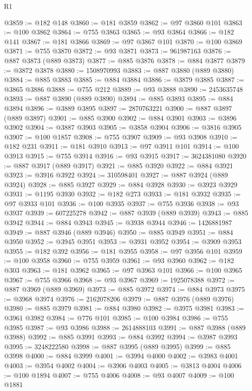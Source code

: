 \begin{lexlean}{R1}
\begin{coremodule}
@3859 := @182 @148
@3860 := @181 @3859
@3862 := @97 @3860 @101
@3863 := @100 @3862
@3864 := @755 @3863
@3865 := @93 @3864
@3866 := @182 @141
@3867 := @181 @3866
@3869 := @97 @3867 @101
@3870 := @100 @3869
@3871 := @755 @3870
@3872 := @93 @3871
@3873 := 961987163
@3876 := @887 @3873 (@889 @3873)
@3877 := @885 @3876
@3878 := @884 @3877
@3879 := @3872 @3878
@3880 := 1508970993
@3883 := @887 @3880 (@889 @3880)
@3884 := @885 @3883
@3885 := @884 @3884
@3886 := @3879 @3885
@3887 := @3865 @3886
@3888 := @755 @212
@3889 := @93 @3888
@3890 := 2453635748
@3893 := @887 @3890 (@889 @3890)
@3894 := @885 @3893
@3895 := @884 @3894
@3896 := @3889 @3895
@3897 := 2870763221
@3900 := @887 @3897 (@889 @3897)
@3901 := @885 @3900
@3902 := @884 @3901
@3903 := @3896 @3902
@3904 := @3887 @3903
@3905 := @3858 @3904
@3906 := @3816 @3905
@3907 := @100 @1857
@3908 := @755 @3907
@3909 := @93 @3908
@3910 := @182 @231
@3911 := @181 @3910
@3913 := @97 @3911 @101
@3914 := @100 @3913
@3915 := @755 @3914
@3916 := @93 @3915
@3917 := 3624381080
@3920 := @887 @3917 (@889 @3917)
@3921 := @885 @3920
@3922 := @884 @3921
@3923 := @3916 @3922
@3924 := 310598401
@3927 := @887 @3924 (@889 @3924)
@3928 := @885 @3927
@3929 := @884 @3928
@3930 := @3923 @3929
@3931 := @1195 @3930
@3932 := @182 @273
@3933 := @181 @3932
@3935 := @97 @3933 @101
@3936 := @100 @3935
@3937 := @755 @3936
@3938 := @93 @3937
@3939 := 607225278
@3942 := @887 @3939 (@889 @3939)
@3943 := @885 @3942
@3944 := @884 @3943
@3945 := @3938 @3944
@3946 := 1426881987
@3949 := @887 @3946 (@889 @3946)
@3950 := @885 @3949
@3951 := @884 @3950
@3952 := @3945 @3951
@3953 := @3931 @3952
@3954 := @3909 @3953
@3955 := @182 @392
@3956 := @181 @3955
@3958 := @97 @3956 @101
@3959 := @100 @3958
@3960 := @755 @3959
@3961 := @93 @3960
@3962 := @182 @303
@3963 := @181 @3962
@3965 := @97 @3963 @101
@3966 := @100 @3965
@3967 := @755 @3966
@3968 := @93 @3967
@3969 := 1925078388
@3972 := @887 @3969 (@889 @3969)
@3973 := @885 @3972
@3974 := @884 @3973
@3975 := @3968 @3974
@3976 := 2162078206
@3979 := @887 @3976 (@889 @3976)
@3980 := @885 @3979
@3981 := @884 @3980
@3982 := @3975 @3981
@3983 := @3961 @3982
@3984 := @776 @101
@3985 := @100 @3984
@3986 := @755 @3985
@3987 := @93 @3986
@3988 := 2614888103
@3991 := @887 @3988 (@889 @3988)
@3992 := @885 @3991
@3993 := @884 @3992
@3994 := @3987 @3993
@3995 := 3248222580
@3998 := @887 @3995 (@889 @3995)
@3999 := @885 @3998
@4000 := @884 @3999
@4001 := @3994 @4000
@4002 := @3983 @4001
@4003 := @3954 @4002
@4004 := @3906 @4003
@4005 := @3813 @4004
@4006 := @100 @1894
@4007 := @755 @4006
@4008 := @93 @4007
@4009 := @100 @1881

\end{coremodule}
\end{lexlean}
